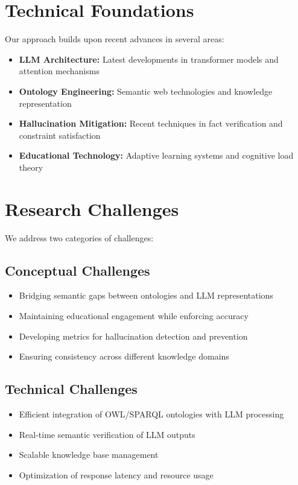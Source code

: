 \section{Technical Foundations}

Our approach builds upon recent advances in several areas:

\begin{itemize}
    \item \textbf{LLM Architecture:} Latest developments in transformer models and attention mechanisms \cite{attention2025heads, meta2024megalodon}
    \item \textbf{Ontology Engineering:} Semantic web technologies and knowledge representation \cite{horrocks2024owl, scibite2024ontologies}
    \item \textbf{Hallucination Mitigation:} Recent techniques in fact verification and constraint satisfaction \cite{hallucination2024survey, zhang2024survey}
    \item \textbf{Educational Technology:} Adaptive learning systems and cognitive load theory \cite{nature2024cognitive, rodriguez2024adaptive, challenging2024cognitive}
\end{itemize}

\section{Research Challenges}

We address two categories of challenges:

\subsection{Conceptual Challenges}
\begin{itemize}
    \item Bridging semantic gaps between ontologies and LLM representations
    \item Maintaining educational engagement while enforcing accuracy
    \item Developing metrics for hallucination detection and prevention
    \item Ensuring consistency across different knowledge domains
\end{itemize}

\subsection{Technical Challenges}
\begin{itemize}
    \item Efficient integration of OWL/SPARQL ontologies with LLM processing
    \item Real-time semantic verification of LLM outputs
    \item Scalable knowledge base management
    \item Optimization of response latency and resource usage
\end{itemize}

